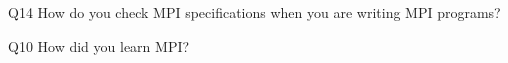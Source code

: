 \begin{description}%
\item{Q14} How do you check MPI specifications when you are writing MPI programs?%
\item{Q10} How did you learn MPI?%
\end{description}%
